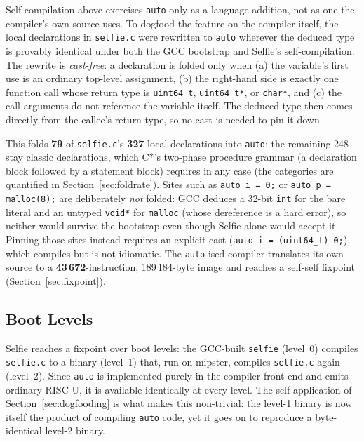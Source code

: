 \documentclass[a4paper,11pt]{article}
\begin{document}
Self-compilation above exercises \texttt{auto} only as a language addition, not as one the compiler's own source uses. To dogfood the feature on the compiler itself, the local declarations in \texttt{selfie.c} were rewritten to \texttt{auto} wherever the deduced type is provably identical under both the GCC bootstrap and Selfie's self-compilation. The rewrite is \emph{cast-free}: a declaration is folded only when (a) the variable's first use is an ordinary top-level assignment, (b) the right-hand side is exactly one function call whose return type is \texttt{uint64\_t}, \texttt{uint64\_t*}, or \texttt{char*}, and (c) the call arguments do not reference the variable itself. The deduced type then comes directly from the callee's return type, so no cast is needed to pin it down.

This folds \textbf{79} of \texttt{selfie.c}'s \textbf{327} local declarations into \texttt{auto}; the remaining 248 stay classic declarations, which C*'s two-phase procedure grammar (a declaration block followed by a statement block) requires in any case (the categories are quantified in Section~\ref{sec:foldrate}). Sites such as \texttt{auto i = 0;} or \texttt{auto p = malloc(8);} are deliberately \emph{not} folded: GCC deduces a 32-bit \texttt{int} for the bare literal and an untyped \texttt{void*} for \texttt{malloc} (whose dereference is a hard error), so neither would survive the bootstrap even though Selfie alone would accept it. Pinning those sites instead requires an explicit cast (\texttt{auto i = (uint64\_t) 0;}), which compiles but is not idiomatic. The \texttt{auto}-ised compiler translates its own source to a \textbf{43\,672}-instruction, 189\,184-byte image and reaches a self-self fixpoint (Section~\ref{sec:fixpoint}).

\subsection{Boot Levels}
\label{sec:bootlevels}

Selfie reaches a fixpoint over boot levels: the GCC-built \texttt{selfie} (level~0) compiles \texttt{selfie.c} to a binary (level~1) that, run on mipster, compiles \texttt{selfie.c} again (level~2). Since \texttt{auto} is implemented purely in the compiler front end and emits ordinary RISC-U, it is available identically at every level. The self-application of Section~\ref{sec:dogfooding} is what makes this non-trivial: the level-1 binary is now itself the product of compiling \texttt{auto} code, yet it goes on to reproduce a byte-identical level-2 binary.
\end{document}
